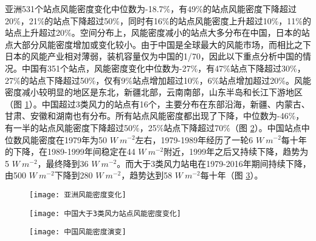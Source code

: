 亚洲531个站点风能密度变化中位数为-18.7\%，有49\%的站点风能密度下降超过20\%，21\%的站点下降超过50\%，同时有16\%的站点风能密度上升超过10\%，11\%的站点上升超过20\%。空间分布上，风能密度减小的站点大多分布在中国，日本的站点大部分风能密度增加或变化较小。由于中国是全球最大的风能市场，而相比之下日本的风能产业相对薄弱，装机容量仅为中国的1/70，因此以下重点分析中国的情况。中国有351个站点，风能密度变化中位数为-27\%，有47\%站点下降超过30\%，27\%的站点下降超过50\%，仅有9\%站点增加超过10\%，6\%站点增加超过20\%。风能密度减小较明显的地区是东北，新疆北部，云南南部，山东半岛和长江下游地区（图 \ref{fig:ASwindpowerchange}）。中国超过3类风力的站点有16个，主要分布在东部沿海，新疆、内蒙古、甘肃、安徽和湖南也有分布。所有站点风能密度都出现了下降，中位数为-46\%，有一半的站点风能密度下降超过50\%，25\%站点下降超过70\%（图 \ref{fig:CHNwindpowerchangeover3}）。中国站点中位数风能密度在1979年为50 $W ~ m^{-2}$左右，1979-1989年经历了一轮6 $W ~ m^{-2}$每十年的下降，在1989-1999年间稳定在44 $W ~ m^{-2}$附近，1999年之后又持续下降，趋势为5 $W ~ m^{-2}$，最终降到36 $W ~ m^{-2}$。而大于3类风力站电在1979-2016年期间持续下降，由500 $W ~ m^{-2}$下降到280 $W ~ m^{-2}$，趋势达到58 $W ~ m^{-2}$每十年（图 \ref{fig:CHNwindpowerevolution}）。

\begin{figure}[!htbp]
    \centering
     \texttt{[image: 亚洲风能密度变化]}
    \label{fig:ASwindpowerchange}
\end{figure}

\begin{figure}[!htbp]
    \centering
     \texttt{[image: 中国大于3类风力站点风能密度变化]}
    \label{fig:CHNwindpowerchangeover3}
\end{figure}

\begin{figure}[!htbp]
    \centering
     \texttt{[image: 中国风能密度演变]}
    \label{fig:CHNwindpowerevolution}
\end{figure}

~\\

